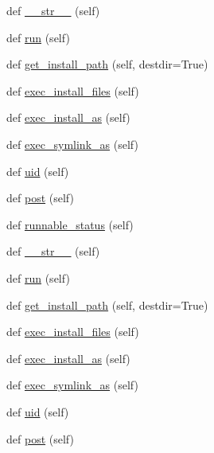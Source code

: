 \begin{DoxyCompactItemize}
\item 
def \hyperlink{classwaflib_1_1_build_1_1inst_a32507c568f479fd6409906270834783e}{\+\_\+\+\_\+str\+\_\+\+\_\+} (self)
\item 
def \hyperlink{classwaflib_1_1_build_1_1inst_a0d03fc4440c06aff0a927181771439be}{run} (self)
\item 
def \hyperlink{classwaflib_1_1_build_1_1inst_ac41fdf31d2133d81d941b1bd68ed31f6}{get\+\_\+install\+\_\+path} (self, destdir=True)
\item 
def \hyperlink{classwaflib_1_1_build_1_1inst_abf856d52d82ec26f4cc6f76a7c01ac8b}{exec\+\_\+install\+\_\+files} (self)
\item 
def \hyperlink{classwaflib_1_1_build_1_1inst_a0c951c9f7df7638fd030f2b4e1822a62}{exec\+\_\+install\+\_\+as} (self)
\item 
def \hyperlink{classwaflib_1_1_build_1_1inst_adf421fc92d636c0b2380b8fcd1a54de6}{exec\+\_\+symlink\+\_\+as} (self)
\item 
def \hyperlink{classwaflib_1_1_build_1_1inst_af3a833db8b118c295a773017f405de79}{uid} (self)
\item 
def \hyperlink{classwaflib_1_1_build_1_1inst_a747341176f2295022038ca17cf839769}{post} (self)
\item 
def \hyperlink{classwaflib_1_1_build_1_1inst_affb0a840290ad8e000488cc0099950ed}{runnable\+\_\+status} (self)
\item 
def \hyperlink{classwaflib_1_1_build_1_1inst_a32507c568f479fd6409906270834783e}{\+\_\+\+\_\+str\+\_\+\+\_\+} (self)
\item 
def \hyperlink{classwaflib_1_1_build_1_1inst_a0d03fc4440c06aff0a927181771439be}{run} (self)
\item 
def \hyperlink{classwaflib_1_1_build_1_1inst_ac41fdf31d2133d81d941b1bd68ed31f6}{get\+\_\+install\+\_\+path} (self, destdir=True)
\item 
def \hyperlink{classwaflib_1_1_build_1_1inst_abf856d52d82ec26f4cc6f76a7c01ac8b}{exec\+\_\+install\+\_\+files} (self)
\item 
def \hyperlink{classwaflib_1_1_build_1_1inst_a0c951c9f7df7638fd030f2b4e1822a62}{exec\+\_\+install\+\_\+as} (self)
\item 
def \hyperlink{classwaflib_1_1_build_1_1inst_adf421fc92d636c0b2380b8fcd1a54de6}{exec\+\_\+symlink\+\_\+as} (self)
\item 
def \hyperlink{classwaflib_1_1_build_1_1inst_af3a833db8b118c295a773017f405de79}{uid} (self)
\item 
def \hyperlink{classwaflib_1_1_build_1_1inst_a747341176f2295022038ca17cf839769}{post} (self)

\end{DoxyCompactItemize}
